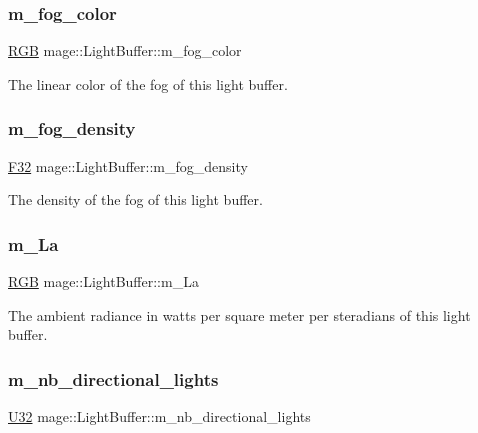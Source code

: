 \subsubsection{\texorpdfstring{m\+\_\+fog\+\_\+color}{m\_fog\_color}}
{\footnotesize\ttfamily \hyperlink{structmage_1_1_r_g_b}{R\+GB} mage\+::\+Light\+Buffer\+::m\+\_\+fog\+\_\+color}

The linear color of the fog of this light buffer. \hypertarget{structmage_1_1_light_buffer_a1bc8ed86ac803e06e5cc3341ccbd7f2d}{}\label{structmage_1_1_light_buffer_a1bc8ed86ac803e06e5cc3341ccbd7f2d} 
\subsubsection{\texorpdfstring{m\+\_\+fog\+\_\+density}{m\_fog\_density}}
{\footnotesize\ttfamily \hyperlink{namespacemage_aa97e833b45f06d60a0a9c4fc22ae02c0}{F32} mage\+::\+Light\+Buffer\+::m\+\_\+fog\+\_\+density}

The density of the fog of this light buffer. \hypertarget{structmage_1_1_light_buffer_a17de50056bd78d5081f9302257b988de}{}\label{structmage_1_1_light_buffer_a17de50056bd78d5081f9302257b988de} 
\subsubsection{\texorpdfstring{m\+\_\+\+La}{m\_La}}
{\footnotesize\ttfamily \hyperlink{structmage_1_1_r_g_b}{R\+GB} mage\+::\+Light\+Buffer\+::m\+\_\+\+La}

The ambient radiance in watts per square meter per steradians of this light buffer. \hypertarget{structmage_1_1_light_buffer_a099a0307b0feacddcf01921f97752307}{}\label{structmage_1_1_light_buffer_a099a0307b0feacddcf01921f97752307} 
\subsubsection{\texorpdfstring{m\+\_\+nb\+\_\+directional\+\_\+lights}{m\_nb\_directional\_lights}}
{\footnotesize\ttfamily \hyperlink{namespacemage_a41c104c036fba3756a74e19f793eeaa1}{U32} mage\+::\+Light\+Buffer\+::m\+\_\+nb\+\_\+directional\+\_\+lights}

